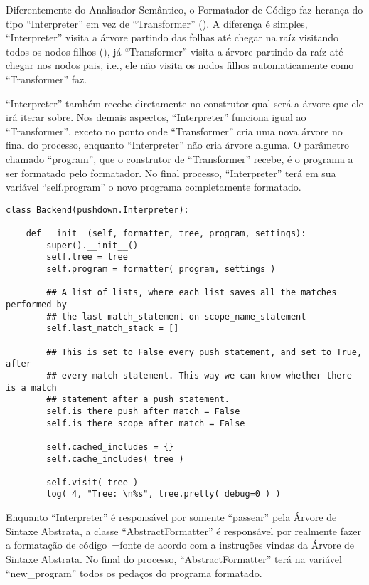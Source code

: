 Diferentemente do Analisador Semântico,
o Formatador de Código faz herança do tipo ``Interpreter'' em vez de ``Transformer'' ().
A diferença é simples,
``Interpreter'' visita a árvore partindo das folhas até chegar na raíz visitando todos os nodos filhos (),
já ``Transformer'' visita a árvore partindo da raíz até chegar nos nodos pais,
i.e.,
ele não visita os nodos filhos automaticamente como ``Transformer'' faz.

``Interpreter'' também recebe diretamente no construtor qual será a árvore que ele irá iterar sobre.
Nos demais aspectos,
``Interpreter'' funciona igual ao ``Transformer'',
exceto no ponto onde ``Transformer'' cria uma nova árvore no final do processo,
enquanto ``Interpreter'' não cria árvore alguma.
O parâmetro chamado ``program'',
que o construtor de ``Transformer'' recebe,
é o programa a ser formatado pelo formatador.
No final processo,
``Interpreter'' terá em sua variável ``self.program'' o novo programa completamente formatado.
\begin{lstlisting}[caption={Construtor do Formatador},label={construtorDoFormatador},style=python_style]
class Backend(pushdown.Interpreter):

    def __init__(self, formatter, tree, program, settings):
        super().__init__()
        self.tree = tree
        self.program = formatter( program, settings )

        ## A list of lists, where each list saves all the matches performed by
        ## the last match_statement on scope_name_statement
        self.last_match_stack = []

        ## This is set to False every push statement, and set to True, after
        ## every match statement. This way we can know whether there is a match
        ## statement after a push statement.
        self.is_there_push_after_match = False
        self.is_there_scope_after_match = False

        self.cached_includes = {}
        self.cache_includes( tree )

        self.visit( tree )
        log( 4, "Tree: \n%s", tree.pretty( debug=0 ) )
\end{lstlisting}

Enquanto ``Interpreter'' é responsável por somente ``passear'' pela Árvore de Sintaxe Abstrata,
a classe ``AbstractFormatter''  é responsável por realmente fazer a formatação de código~=fonte de acordo com a instruções vindas da Árvore de Sintaxe Abstrata.
No final do processo,
``AbstractFormatter'' terá na variável ``new\_program'' todos os pedaços do programa formatado.

